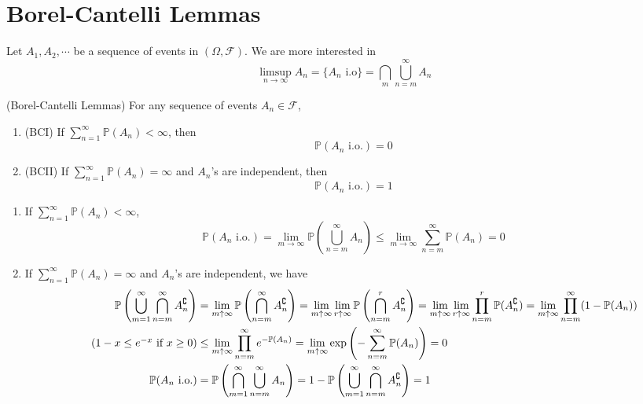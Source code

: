 \documentclass{huhtakm-template-book}
\newcommand{\prob}{\mathbb{P}}
\begin{document}
\section{Borel-Cantelli Lemmas}
Let $A_{1},A_{2},\cdots$ be a sequence of events in $(\Omega,\mathcal{F})$. We are more interested in
\begin{equation*}
    \limsup_{n\to\infty}A_{n}=\{A_{n}\text{ i.o}\}=\bigcap_{m}\bigcup_{n=m}^{\infty} A_{n}
\end{equation*}
\begin{thm}(Borel-Cantelli Lemmas)
    For any sequence of events $A_{n}\in\mathcal{F}$,
    \begin{enumerate}
        \item (BCI) If $\sum_{n=1}^{\infty}\prob(A_{n})<\infty$, then
        \begin{equation*}
            \prob(A_{n}\text{ i.o.})=0
        \end{equation*}
        \item (BCII) If $\sum_{n=1}^{\infty}\prob(A_{n})=\infty$ and $A_{n}$'s are independent, then
        \begin{equation*}
            \prob(A_{n}\text{ i.o.})=1
        \end{equation*}
    \end{enumerate}
\end{thm}
\begin{proofing}
    \begin{enumerate}
        \item If $\sum_{n=1}^{\infty}\prob(A_{n})<\infty$,
        \begin{equation*}
            \prob(A_{n}\text{ i.o.})=\lim_{m\to\infty}\prob\left(\bigcup_{n=m}^{\infty}A_{n}\right)\leq\lim_{m\to\infty}\sum_{n=m}^{\infty}\prob(A_{n})=0
        \end{equation*}
        \item If $\sum_{n=1}^{\infty}\prob(A_{n})=\infty$ and $A_{n}$'s are independent, we have
        \begin{align*}
            \prob\left(\bigcup_{m=1}^{\infty}\bigcap_{n=m}^{\infty}A_{n}^{\complement}\right)&=\lim_{m\uparrow\infty}\prob\left(\bigcap_{n=m}^{\infty}A_{n}^{\complement}\right)=\lim_{m\uparrow\infty}\lim_{r\uparrow\infty}\prob\left(\bigcap_{n=m}^{r}A_{n}^{\complement}\right)=\lim_{m\uparrow\infty}\lim_{r\uparrow\infty}\prod_{n=m}^{r}\prob(A_{n}^{\complement})=\lim_{m\uparrow\infty}\prod_{n=m}^{\infty}(1-\prob(A_{n}))\\
            \tag{$1-x\leq e^{-x}$ if $x\geq 0$}
            &\leq\lim_{m\uparrow\infty}\prod_{n=m}^{\infty}e^{-\prob(A_{n})}=\lim_{m\uparrow\infty}\exp\left(-\sum_{n=m}^{\infty}\prob(A_{n})\right)=0\\
            \prob(A_{n}\text{ i.o.})&=\prob\left(\bigcap_{m=1}^{\infty}\bigcup_{n=m}^{\infty}A_{n}\right)=1-\prob\left(\bigcup_{m=1}^{\infty}\bigcap_{n=m}^{\infty}A_{n}^{\complement}\right)=1
        \end{align*}
    \end{enumerate}
\end{proofing}
\end{document}
